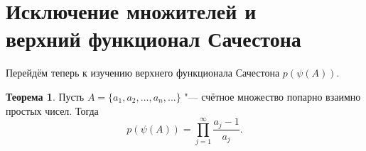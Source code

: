 \documentclass[a4paper,openbib]{article}
\theoremstyle{definition}
\newtheorem{theorem}[lemma]{Теорема}
\begin{document}
\section{Исключение множителей и \\ верхний функционал Сачестона}


Перейдём теперь к изучению верхнего функционала Сачестона $p(\psi(A))$.

\begin{theorem}
	\label{thm:ac0_primes_p_psi_A_prod}
	Пусть $A = \{a_1, a_2, ..., a_n,...\}$ "--- счётное множество попарно взаимно простых чисел.
	Тогда
	\begin{equation}
		p(\psi(A)) = \prod_{j=1}^\infty \frac{a_j -1}{a_j}
		.
	\end{equation}
\end{theorem}
\end{document}
